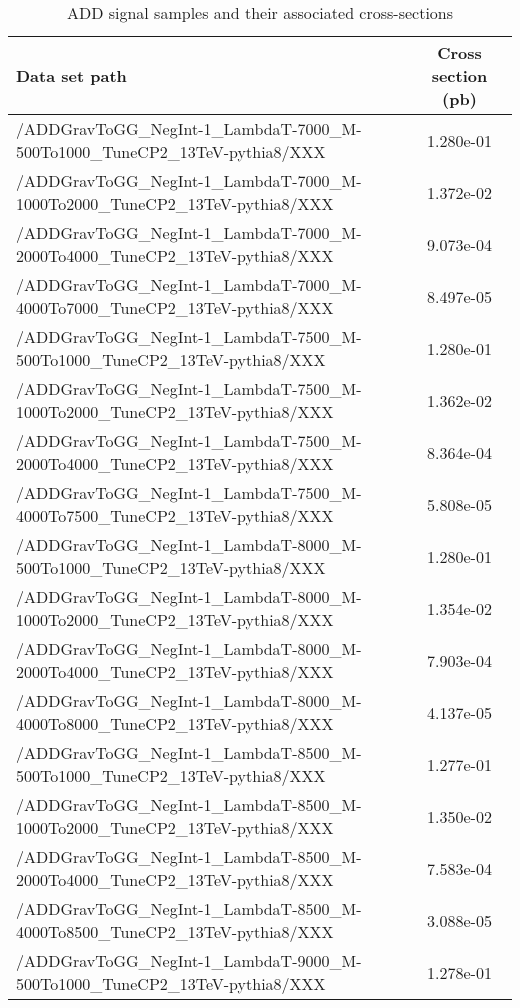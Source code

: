 \begin{landscape}
\begin{table}[!htbp]
       \caption{ ADD signal samples and their associated cross-sections }
       \centering
       \vspace{\baselineskip}
       \begin{tabular}{lc}
       \hline \hline
       Data set path & Cross section (pb)\\
       \hline

       /ADDGravToGG\_NegInt-1\_LambdaT-7000\_M-500To1000\_TuneCP2\_13TeV-pythia8/XXX &  1.280e-01\\
       /ADDGravToGG\_NegInt-1\_LambdaT-7000\_M-1000To2000\_TuneCP2\_13TeV-pythia8/XXX &  1.372e-02\\
       /ADDGravToGG\_NegInt-1\_LambdaT-7000\_M-2000To4000\_TuneCP2\_13TeV-pythia8/XXX &  9.073e-04\\
       /ADDGravToGG\_NegInt-1\_LambdaT-7000\_M-4000To7000\_TuneCP2\_13TeV-pythia8/XXX &  8.497e-05\\
       /ADDGravToGG\_NegInt-1\_LambdaT-7500\_M-500To1000\_TuneCP2\_13TeV-pythia8/XXX &  1.280e-01\\
       /ADDGravToGG\_NegInt-1\_LambdaT-7500\_M-1000To2000\_TuneCP2\_13TeV-pythia8/XXX &  1.362e-02\\
       /ADDGravToGG\_NegInt-1\_LambdaT-7500\_M-2000To4000\_TuneCP2\_13TeV-pythia8/XXX &  8.364e-04\\
       /ADDGravToGG\_NegInt-1\_LambdaT-7500\_M-4000To7500\_TuneCP2\_13TeV-pythia8/XXX &  5.808e-05\\
       /ADDGravToGG\_NegInt-1\_LambdaT-8000\_M-500To1000\_TuneCP2\_13TeV-pythia8/XXX &  1.280e-01\\
       /ADDGravToGG\_NegInt-1\_LambdaT-8000\_M-1000To2000\_TuneCP2\_13TeV-pythia8/XXX &  1.354e-02\\
       /ADDGravToGG\_NegInt-1\_LambdaT-8000\_M-2000To4000\_TuneCP2\_13TeV-pythia8/XXX &  7.903e-04\\
       /ADDGravToGG\_NegInt-1\_LambdaT-8000\_M-4000To8000\_TuneCP2\_13TeV-pythia8/XXX &  4.137e-05\\
       /ADDGravToGG\_NegInt-1\_LambdaT-8500\_M-500To1000\_TuneCP2\_13TeV-pythia8/XXX &  1.277e-01\\
       /ADDGravToGG\_NegInt-1\_LambdaT-8500\_M-1000To2000\_TuneCP2\_13TeV-pythia8/XXX &  1.350e-02\\
       /ADDGravToGG\_NegInt-1\_LambdaT-8500\_M-2000To4000\_TuneCP2\_13TeV-pythia8/XXX &  7.583e-04\\
       /ADDGravToGG\_NegInt-1\_LambdaT-8500\_M-4000To8500\_TuneCP2\_13TeV-pythia8/XXX &  3.088e-05\\
       /ADDGravToGG\_NegInt-1\_LambdaT-9000\_M-500To1000\_TuneCP2\_13TeV-pythia8/XXX &  1.278e-01\\

       \hline \hline
       \end{tabular}
       \label{table:ADD_signal_samples_xsec}
\end{table}
\end{landscape}

